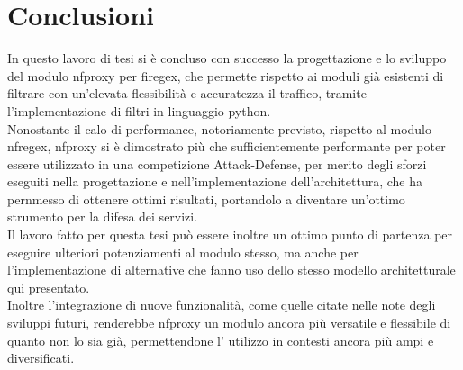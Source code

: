 \chapter*{Conclusioni}\label{chap:ending}

In questo lavoro di tesi si è concluso con successo la progettazione e lo sviluppo del modulo \gls{nfproxy} per firegex, che permette rispetto ai moduli già esistenti di filtrare con un'elevata flessibilità e accuratezza il traffico, tramite l'implementazione di filtri in linguaggio python.\\
Nonostante il calo di performance, notoriamente previsto, rispetto al modulo \gls{nfregex}, \gls{nfproxy} si è dimostrato più che sufficientemente performante per poter essere utilizzato in una competizione Attack-Defense, per merito degli sforzi eseguiti nella progettazione e nell'implementazione
dell'architettura, che ha pernmesso di ottenere ottimi risultati, portandolo a diventare un'ottimo strumento per la difesa dei servizi.\\

Il lavoro fatto per questa tesi può essere inoltre un ottimo punto di partenza per eseguire ulteriori potenziamenti al modulo stesso, ma anche per l'implementazione di alternative che fanno uso dello stesso modello architetturale qui presentato.\\
Inoltre l'integrazione di nuove funzionalità, come quelle citate nelle note degli sviluppi futuri, renderebbe \gls{nfproxy} un modulo ancora più versatile e flessibile di quanto non lo sia già, permettendone l' utilizzo in contesti ancora più ampi e diversificati.\\

